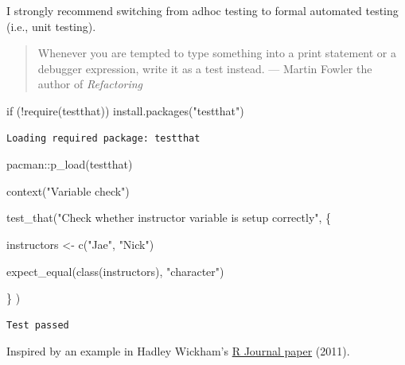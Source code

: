 \documentclass[
  letterpaper,
  DIV=11,
  numbers=noendperiod]{scrreprt}
\newenvironment{Shaded}{\begin{snugshade}}{\end{snugshade}}
\newcommand{\ControlFlowTok}[1]{\textcolor[rgb]{0.00,0.23,0.31}{#1}}
\newcommand{\FunctionTok}[1]{\textcolor[rgb]{0.28,0.35,0.67}{#1}}
\newcommand{\NormalTok}[1]{\textcolor[rgb]{0.00,0.23,0.31}{#1}}
\newcommand{\OtherTok}[1]{\textcolor[rgb]{0.00,0.23,0.31}{#1}}
\newcommand{\SpecialCharTok}[1]{\textcolor[rgb]{0.37,0.37,0.37}{#1}}
\newcommand{\StringTok}[1]{\textcolor[rgb]{0.13,0.47,0.30}{#1}}
\begin{document}
I strongly recommend switching from adhoc testing to formal automated
testing (i.e., unit testing).

\begin{quote}
Whenever you are tempted to type something into a print statement or a
debugger expression, write it as a test instead. --- Martin Fowler the
author of \emph{Refactoring}
\end{quote}

\begin{Shaded}
\begin{Highlighting}[]
\ControlFlowTok{if}\NormalTok{ (}\SpecialCharTok{!}\FunctionTok{require}\NormalTok{(testthat)) }\FunctionTok{install.packages}\NormalTok{(}\StringTok{"testthat"}\NormalTok{)}
\end{Highlighting}
\end{Shaded}

\begin{verbatim}
Loading required package: testthat
\end{verbatim}

\begin{Shaded}
\begin{Highlighting}[]
\NormalTok{pacman}\SpecialCharTok{::}\FunctionTok{p\_load}\NormalTok{(testthat)}

\FunctionTok{context}\NormalTok{(}\StringTok{"Variable check"}\NormalTok{)}

\FunctionTok{test\_that}\NormalTok{(}\StringTok{"Check whether instructor variable is setup correctly"}\NormalTok{, \{}
  
\NormalTok{  instructors }\OtherTok{\textless{}{-}} \FunctionTok{c}\NormalTok{(}\StringTok{"Jae"}\NormalTok{, }\StringTok{"Nick"}\NormalTok{)}

  \FunctionTok{expect\_equal}\NormalTok{(}\FunctionTok{class}\NormalTok{(instructors), }\StringTok{"character"}\NormalTok{)}

\NormalTok{\}}
\NormalTok{)}
\end{Highlighting}
\end{Shaded}

\begin{verbatim}
Test passed 
\end{verbatim}

Inspired by an example in Hadley Wickham's
\href{https://journal.r-project.org/archive/2011-1/RJournal_2011-1_Wickham.pdf}{R
Journal paper} (2011).
\end{document}
